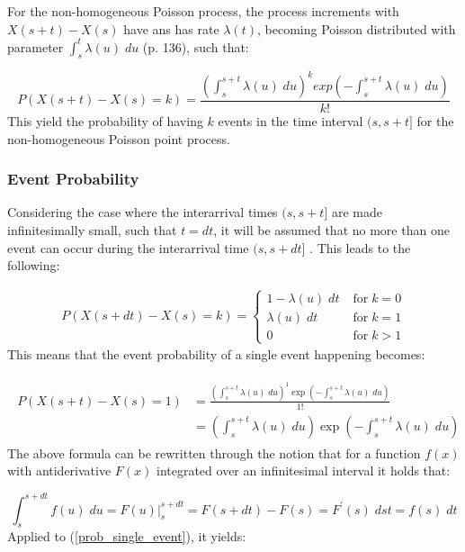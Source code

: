 For the non-homogeneous Poisson process, the process increments with $X(s+t) - X(s)$ have ans has rate $\lambda(t)$, becoming Poisson distributed with parameter $\int_s^t \lambda(u)\; du$ \cite{Bas2019AProcess} (p. 136), such that:

\begin{equation}
    P(X(s+t) - X(s) = k) = \frac{\left(\int_s^{s+t} \lambda(u) \; du \right)^k exp\left(-\int_s^{s+t} \lambda(u) \; du\right)}{k!}
\end{equation}
This yield the probability of having $k$ events in the time interval $(s, s+t]$ for the non-homogeneous Poisson point process.


\subsubsection{Event Probability}
\label{sec:Method:Poisson:EventProbability}
Considering the case where the interarrival times $(s, s+t]$ are made infinitesimally small, such that $t = dt$, it will be assumed that no more than one event can occur during the interarrival time $(s, s+dt]$ \cite{Tommerup2021LearningNetworks}.
This leads to the following:

\begin{align}
P(X(s+dt) - X(s) = k) = 
\begin{cases}
    1 - \lambda(u) \; dt \; &\text{for} \; k=0 \\
    \lambda(u) \; dt \; &\text{for} \; k=1 \\
    0 \; &\text{for} \; k > 1
\end{cases}
\end{align}
This means that the event probability of a single event happening becomes:

\begin{align}
\begin{split}
    P(X(s+t) - X(s) = 1) 
    &= 
    \frac{\left(\int_s^{s+t} \lambda(u) \; du \right)^1 \exp \left(-\int_s^{s+t} \lambda(u) \; du\right)}{1!} \\
    &= 
    \left(\int_s^{s+t} \lambda(u) \; du \right) \exp \left(-\int_s^{s+t} \lambda(u) \; du\right)
\label{prob_single_event}
\end{split}
\end{align}
The above formula can be rewritten through the notion that for a function $f(x)$ with antiderivative $F(x)$ integrated over an infinitesimal interval it holds that:

\begin{equation}
    \int_s^{s+dt} f(u) \; du = F(u) \rvert_s^{s+dt} = F(s+dt) - F(s) = F^{\prime}(s) \; dst = f(s) \; dt
\end{equation}
Applied to (\ref{prob_single_event}), it yields:

